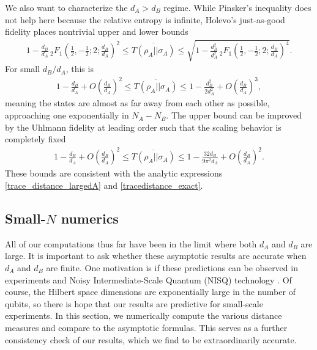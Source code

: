 \documentclass[a4paper,11pt]{article}
\begin{document}
We also want to characterize the $d_A > d_B$ regime. While Pinsker's inequality does not help here because the relative entropy is infinite, Holevo's just-as-good fidelity places nontrivial upper and lower bounds
\begin{align}
    1 - \frac{d_B}{d_A} \,_2F_1\left(\frac{1}{2},-\frac{1}{2};2;\frac{d_B}{d_A}\right)^2 \leq 
    \overline{T(
    {
    \rho_A} 
    || 
    {
    \sigma_A})}  \leq \sqrt{1-\frac{d_B^2}{d_A^2} \,_2F_1\left(\frac{1}{2},-\frac{1}{2};2;\frac{d_B}{d_A}\right)^4}.
    \label{T_bound_largedA}
\end{align}
For small $d_B/d_A$, this is
\begin{align}
    1 - \frac{d_B}{d_A} + O\left(\frac{d_B}{d_A}\right)^2 \leq \overline{T(
    {
    \rho_A} 
    || 
    {
    \sigma_A})}  \leq  1- \frac{d_B^2}{ 2 d_A^2}+ O\left(\frac{d_B}{d_A}\right)^3 ,
\end{align}
meaning the states are almost as far away from each other as possible, approaching one exponentially in $N_A-N_B$. The upper bound can be improved by the Uhlmann fidelity at leading order such that the scaling behavior is completely fixed
\begin{align}
    1 - \frac{d_B}{d_A} + O\left(\frac{d_B}{d_A}\right)^2 \leq \overline{T(
    {
    \rho_A} 
    || 
    {
    \sigma_A})}  \leq  1- \frac{32 d_B}{9\pi^2 d_A}+ O\left(\frac{d_B}{d_A}\right)^2 .
\end{align}
These bounds are consistent with the analytic expressions \eqref{trace_distance_largedA} and \eqref{tracedistance_exact}.

\subsection{Small-$N$ numerics}

All of our computations thus far have been in the limit where both $d_A$ and $d_B$ are large. It is important to ask whether these asymptotic results are accurate when $d_A$ and $d_B$ are finite. One motivation is if these predictions can be observed in experiments and Noisy Intermediate-Scale Quantum (NISQ) technology \cite{2018arXiv180100862P}. Of course, the Hilbert space dimensions are exponentially large in the number of qubits, so there is hope that our results are predictive for small-scale experiments. In this section, we numerically compute the various distance measures and compare to the asymptotic formulas. This serves as a further consistency check of our results, which we find to be extraordinarily accurate. 
\end{document}
